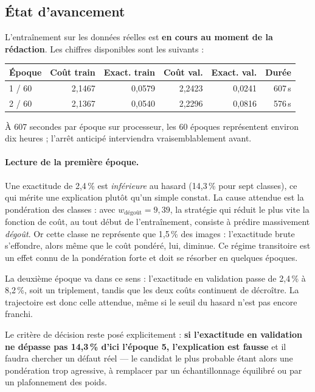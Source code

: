 \documentclass[11pt,a4paper]{article}
\begin{document}
\subsection{État d'avancement}

L'entraînement sur les données réelles est \textbf{en cours au moment de la
rédaction}. Les chiffres disponibles sont les suivants :

\begin{center}
\small
\begin{tabular}{lrrrrr}
\toprule
\textbf{Époque} & \textbf{Coût train} & \textbf{Exact. train} & \textbf{Coût val.} & \textbf{Exact. val.} & \textbf{Durée} \\
\midrule
1 / 60 & 2{,}1467 & 0{,}0579 & 2{,}2423 & 0{,}0241 & 607\,s \\
2 / 60 & 2{,}1367 & 0{,}0540 & 2{,}2296 & 0{,}0816 & 576\,s \\
\bottomrule
\end{tabular}
\end{center}

À 607 secondes par époque sur processeur, les 60 époques représentent environ
dix heures ; l'arrêt anticipé interviendra vraisemblablement avant.

\paragraph{Lecture de la première époque.}
Une exactitude de 2{,}4\,\% est \emph{inférieure} au hasard (14{,}3\,\% pour sept
classes), ce qui mérite une explication plutôt qu'un simple constat. La cause
attendue est la pondération des classes : avec $w_{\text{dégoût}} = 9{,}39$, la
stratégie qui réduit le plus vite la fonction de coût, au tout début de
l'entraînement, consiste à prédire massivement \emph{dégoût}. Or cette classe ne
représente que 1{,}5\,\% des images : l'exactitude brute s'effondre, alors même
que le coût pondéré, lui, diminue. Ce régime transitoire est un effet connu de
la pondération forte et doit se résorber en quelques époques.

La deuxième époque va dans ce sens : l'exactitude en validation passe de
2{,}4\,\% à 8{,}2\,\%, soit un triplement, tandis que les deux coûts continuent
de décroître. La trajectoire est donc celle attendue, même si le seuil du hasard
n'est pas encore franchi.

Le critère de décision reste posé explicitement : \textbf{si l'exactitude en
validation ne dépasse pas 14{,}3\,\% d'ici l'époque 5, l'explication est fausse}
et il faudra chercher un défaut réel --- le candidat le plus probable étant alors
une pondération trop agressive, à remplacer par un échantillonnage équilibré ou
par un plafonnement des poids.
\end{document}
